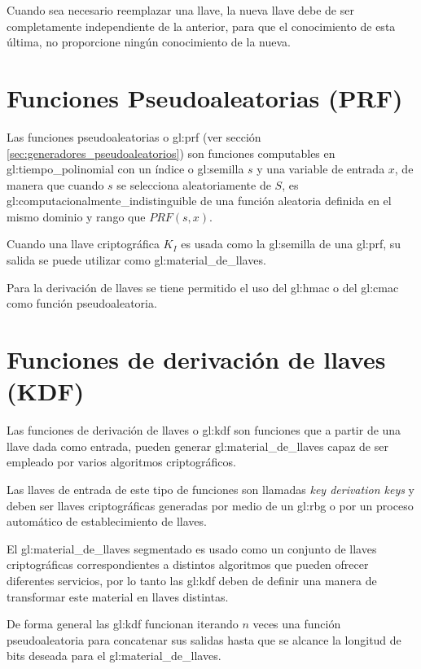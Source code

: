 Cuando sea necesario reemplazar una llave, la nueva llave debe de ser
completamente independiente de la anterior, para que el conocimiento de esta
última, no proporcione ningún conocimiento de la nueva.


\section{Funciones Pseudoaleatorias (PRF)}

Las funciones pseudoaleatorias o \gls{gl:prf} (ver sección
\ref{sec:generadores_pseudoaleatorios}) son funciones computables en
\gls{gl:tiempo_polinomial} con un índice o \gls{gl:semilla} $s$ y una variable
de entrada $x$, de manera que cuando $s$ se selecciona aleatoriamente de $S$,
es \gls{gl:computacionalmente_indistinguible} de una función aleatoria
definida en el mismo dominio y rango que $PRF(s,x)$.

Cuando una llave criptográfica $K_I$ es usada como la \gls{gl:semilla} de una
\gls{gl:prf}, su salida se puede utilizar como \gls{gl:material_de_llaves}.

Para la derivación de llaves se tiene permitido el uso del \gls{gl:hmac} o
del \gls{gl:cmac} como función pseudoaleatoria.

\section{Funciones de derivación de llaves (KDF)}

Las funciones de derivación de llaves o \gls{gl:kdf} son funciones que a
partir de una llave dada como entrada, pueden generar
\gls{gl:material_de_llaves} capaz de ser empleado por varios algoritmos
criptográficos.

Las llaves de entrada de este tipo de funciones son llamadas \textit{key
derivation keys} y deben ser llaves criptográficas generadas por medio de un
\gls{gl:rbg} o por un proceso automático de establecimiento de llaves.

El \gls{gl:material_de_llaves} segmentado es usado como un conjunto de llaves
criptográficas correspondientes a distintos algoritmos que pueden ofrecer
diferentes servicios, por lo tanto las \gls{gl:kdf} deben de definir una
manera de transformar este material en llaves distintas.

De forma general las \gls{gl:kdf} funcionan iterando $n$ veces una función
pseudoaleatoria para concatenar sus salidas hasta que se alcance la longitud
de bits deseada para el \gls{gl:material_de_llaves}.


